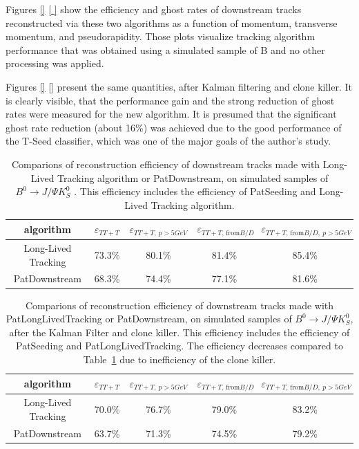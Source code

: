 Figures \ref{} \ref{ } show the efficiency and ghost rates of downstream tracks reconstructed via these two algorithms as a function of momentum, transverse momentum, and pseudorapidity. Those plots visualize tracking algorithm performance that was obtained using a simulated sample of B  and no other processing was applied. 

Figures \ref{} \ref{} present the same quantities, after Kalman filtering and clone killer. 
It is clearly visible, that the performance gain and the strong reduction of ghost rates were measured for the new algorithm. It is presumed that the significant ghost rate reduction (about 16\%) was achieved due to the good performance of the T-Seed classifier, which was one of the major goals of the author’s study. 


\begin{table}[htp]
\caption{Comparions of reconstruction efficiency of downstream tracks made with Long-Lived Tracking algorithm or PatDownstream, on simulated samples of $B^{0} \rightarrow J/\Psi K^{0}_{S}$ . This efficiency includes the efficiency of PatSeeding and Long-Lived Tracking algorithm.}
\begin{center}
\begin{tabular}{c|c|c|c|c}
algorithm & $\varepsilon_{TT+T}$ & $\varepsilon_{TT+T, ~p>5 GeV}$ & $\varepsilon_{TT+T\text{, from} B/D}$ & $\varepsilon_{TT+T\text{, from} B/D, ~p>5 GeV}$ \\
\hline 
Long-Lived Tracking & 73.3\% & 80.1\% & 81.4\% & 85.4\%\\
PatDownstream          & 68.3\% & 74.4\% & 77.1\% & 81.6\% 
\end{tabular}
\end{center}
\label{tab:PatLLTPatDownstreamEffComp}
\end{table}%

\begin{table}[htp]
\caption{Comparions of reconstruction efficiency of downstream tracks made with PatLongLivedTracking or PatDownstream, on simulated samples of $B^{0} \rightarrow J/\Psi K^{0}_{S}$, after the Kalman Filter and clone killer. This efficiency includes the efficiency of PatSeeding and PatLongLivedTracking. The efficiency decreases compared to Table~\ref{tab:PatLLTPatDownstreamEffComp} due to inefficiency of the clone killer.}
\begin{center}
\begin{tabular}{c|c|c|c|c}
algorithm & $\varepsilon_{TT+T}$ & $\varepsilon_{TT+T, ~p>5 GeV}$ & $\varepsilon_{TT+T\text{, from} B/D}$ & $\varepsilon_{TT+T\text{, from} B/D, ~p>5 GeV}$ \\
\hline 
Long-Lived Tracking & 70.0\% & 76.7\% & 79.0\% & 83.2\% \\
PatDownstream          & 63.7\% & 71.3\% & 74.5\% & 79.2\% 
\end{tabular}
\end{center}
\label{tab:PatLLTPatDownstreamEffCompTBTC}
\end{table}%

